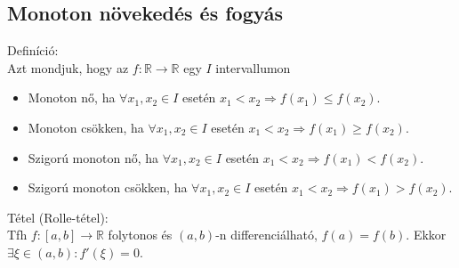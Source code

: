 \documentclass[12pt,a4paper]{scrartcl}
\providecommand{\tightlist}{%
  \setlength{\itemsep}{0pt}\setlength{\parskip}{0pt}}
\newenvironment{definicio}{}{}
\newenvironment{tetel}{}{}
\begin{document}
\hypertarget{monoton-novekedes-es-fogyas}{%
\subsection{Monoton növekedés és
fogyás}\label{monoton-novekedes-es-fogyas}}

\begin{definicio}

Definíció:\\
Azt mondjuk, hogy az
\(\left. f:{\mathbb{R}}\rightarrow{\mathbb{R}} \right.\) egy \(I\)
intervallumon

\begin{itemize}
\tightlist
\item
  Monoton nő, ha \(\forall x_{1},x_{2} \in I\) esetén
  \(\left. x_{1} < x_{2}\Rightarrow f\left( x_{1} \right) \leq f\left( x_{2} \right) \right.\).
\item
  Monoton csökken, ha \(\forall x_{1},x_{2} \in I\) esetén
  \(\left. x_{1} < x_{2}\Rightarrow f\left( x_{1} \right) \geq f\left( x_{2} \right) \right.\).
\item
  Szigorú monoton nő, ha \(\forall x_{1},x_{2} \in I\) esetén
  \(\left. x_{1} < x_{2}\Rightarrow f\left( x_{1} \right) < f\left( x_{2} \right) \right.\).
\item
  Szigorú monoton csökken, ha \(\forall x_{1},x_{2} \in I\) esetén
  \(\left. x_{1} < x_{2}\Rightarrow f\left( x_{1} \right) > f\left( x_{2} \right) \right.\).
\end{itemize}

\end{definicio}

\begin{tetel}

Tétel (Rolle-tétel):\\
Tfh
\(\left. f:\left\lbrack {a,b} \right\rbrack\rightarrow{\mathbb{R}} \right.\)
folytonos és \(\left( {a,b} \right)\)-n differenciálható,
\(f\left( a \right) = f\left( b \right)\). Ekkor
\(\exists\xi \in \left( {a,b} \right):f'\left( \xi \right) = 0\).

\end{tetel}
\end{document}
